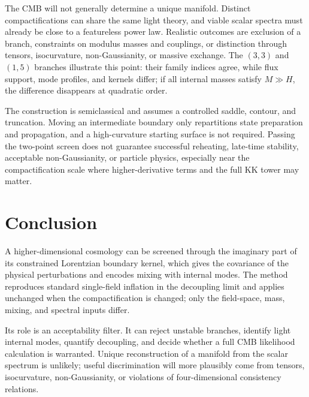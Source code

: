 \documentclass[aps,prd,twocolumn,superscriptaddress,nofootinbib,longbibliography,floatfix]{revtex4-2}
\begin{document}
The CMB will not generally determine a unique manifold. Distinct compactifications can share the same light theory, and viable scalar spectra must already be close to a featureless power law. Realistic outcomes are exclusion of a branch, constraints on modulus masses and couplings, or distinction through tensors, isocurvature, non-Gaussianity, or massive exchange. The $(3,3)$ and $(1,5)$ branches illustrate this point: their family indices agree, while flux support, mode profiles, and kernels differ; if all internal masses satisfy $M\gg H$, the difference disappears at quadratic order.

The construction is semiclassical and assumes a controlled saddle, contour, and truncation. Moving an intermediate boundary only repartitions state preparation and propagation, and a high-curvature starting surface is not required. Passing the two-point screen does not guarantee successful reheating, late-time stability, acceptable non-Gaussianity, or particle physics, especially near the compactification scale where higher-derivative terms and the full KK tower may matter.

\section{Conclusion}
A higher-dimensional cosmology can be screened through the imaginary part of its constrained Lorentzian boundary kernel, which gives the covariance of the physical perturbations and encodes mixing with internal modes. The method reproduces standard single-field inflation in the decoupling limit and applies unchanged when the compactification is changed; only the field-space, mass, mixing, and spectral inputs differ.

Its role is an acceptability filter. It can reject unstable branches, identify light internal modes, quantify decoupling, and decide whether a full CMB likelihood calculation is warranted. Unique reconstruction of a manifold from the scalar spectrum is unlikely; useful discrimination will more plausibly come from tensors, isocurvature, non-Gaussianity, or violations of four-dimensional consistency relations.

\appendix
\end{document}
